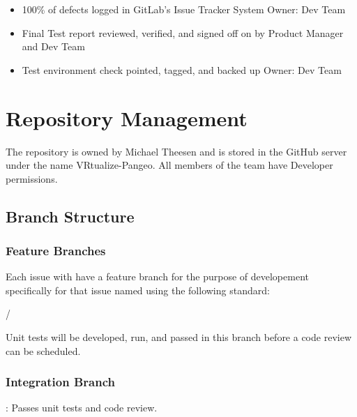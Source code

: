\documentclass[letterpaper,10pt,english]{sphinxmanual}
\let\sphinxpxdimen\pdfpxdimen\else\newdimen\sphinxpxdimen
\begin{document}
\begin{itemize}
\begin{description}
\begin{itemize}
\item {} 
100\% of defects logged in GitLab’s  Issue Tracker System  Owner: Dev Team

\item {} 
Final Test report reviewed, verified, and signed off on by Product Manager and Dev Team

\item {} 
Test environment check pointed, tagged, and backed up     Owner: Dev Team

\end{itemize}

\end{description}

\end{itemize}


\section{Repository Management}
\label{\detokenize{test_plan/repository_management:repository-management}}\label{\detokenize{test_plan/repository_management::doc}}
The repository is owned by Michael Theesen and is stored in the GitHub server under the name VRtualize-Pangeo. All members of the team have Developer permissions.


\subsection{Branch Structure}
\label{\detokenize{test_plan/repository_management:branch-structure}}
\noindent\sphinxincludegraphics[width=600\sphinxpxdimen]{{branch_structure}.png}


\subsubsection{Feature Branches}
\label{\detokenize{test_plan/repository_management:feature-branches}}
Each issue with have a feature branch for the purpose of developement specifically for that issue named using the following standard:

/

Unit tests will be developed, run, and passed in this branch before a code review can be scheduled.


\subsubsection{Integration Branch}
\label{\detokenize{test_plan/repository_management:integration-branch}}
: Passes unit tests and code review.
\end{document}
